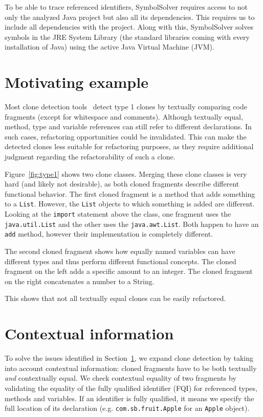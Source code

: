 \documentclass[journal]{IEEEtran}
\begin{document}
To be able to trace referenced identifiers, SymbolSolver requires access to not only the analyzed Java project but also all its dependencies. This requires us to include all dependencies with the project. Along with this, SymbolSolver solves symbols in the JRE System Library (the standard libraries coming with every installation of Java) using the active Java Virtual Machine (JVM). %

\section{Motivating example} \label{sec:type1}
Most clone detection tools~\cite{kamiya2002ccfinder, semura2017ccfindersw, roy2008nicad, svajlenko2016bigcloneeval, svajlenko2014evaluating} detect type 1 clones by textually comparing code fragments (except for whitespace and comments). Although textually equal, method, type and variable references can still refer to different declarations. In such cases, refactoring opportunities could be invalidated. This can make the detected clones less suitable for refactoring purposes, as they require additional judgment regarding the refactorability of such a clone.

Figure~\ref{fig:type1} shows two clone classes. Merging these clone classes is very hard (and likely not desirable), as both cloned fragments describe different functional behavior. The first cloned fragment is a method that adds something to a \texttt{List}. However, the \texttt{List} objects to which something is added are different. Looking at the \texttt{import} statement above the class, one fragment uses the \texttt{java.util.List} and the other uses the \texttt{java.awt.List}. Both happen to have an \texttt{add} method, however their implementation is completely different.

The second cloned fragment shows how equally named variables can have different types and thus perform different functional concepts. The cloned fragment on the left adds a specific amount to an integer. The cloned fragment on the right concatenates a number to a String.

This shows that not all textually equal clones can be easily refactored.

\section{Contextual information}
To solve the issues identified in Section~\ref{sec:type1}, we expand clone detection by taking into account contextual information: cloned fragments have to be both textually \textit{and} contextually equal. We check contextual equality of two fragments by validating the equality of the fully qualified identifier (FQI) for referenced types, methods and variables. If an identifier is fully qualified, it means we specify the full location of its declaration (e.g. \texttt{com.sb.fruit.Apple} for an \texttt{Apple} object).
\end{document}
